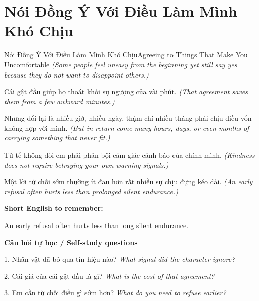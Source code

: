 \section{Nói Đồng Ý Với Điều Làm Mình Khó Chịu}
\begin{truyen}{Nói Đồng Ý Với Điều Làm Mình Khó Chịu}{Agreeing to Things That Make You Uncomfortable}
\textit{(Some people feel uneasy from the beginning yet still say yes because they do not want to disappoint others.)}

Cái gật đầu giúp họ thoát khỏi sự ngượng của vài phút.
\textit{(That agreement saves them from a few awkward minutes.)}

Nhưng đổi lại là nhiều giờ, nhiều ngày, thậm chí nhiều tháng phải chịu điều vốn không hợp với mình.
\textit{(But in return come many hours, days, or even months of carrying something that never fit.)}

Tử tế không đòi em phải phản bội cảm giác cảnh báo của chính mình.
\textit{(Kindness does not require betraying your own warning signals.)}

\end{truyen}

\begin{baihoc}
Một lời từ chối sớm thường ít đau hơn rất nhiều sự chịu đựng kéo dài.
\textit{(An early refusal often hurts less than prolonged silent endurance.)}
\end{baihoc}

\begin{ghinhoanh}
\textbf{Short English to remember:}

An early refusal often hurts less than long silent endurance.

\end{ghinhoanh}

\begin{tuhocnhanh}
\textbf{Câu hỏi tự học / Self-study questions}

1. Nhân vật đã bỏ qua tín hiệu nào? \textit{What signal did the character ignore?}

2. Cái giá của cái gật đầu là gì? \textit{What is the cost of that agreement?}

3. Em cần từ chối điều gì sớm hơn? \textit{What do you need to refuse earlier?}
\end{tuhocnhanh}
\ngancach

